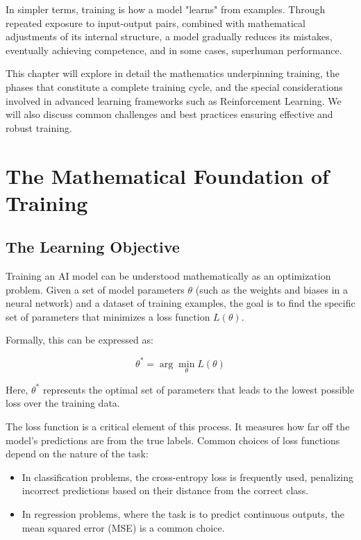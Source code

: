 \documentclass[openany]{book}
\begin{document}
In simpler terms, training is how a model "learns" from examples. Through 
repeated exposure to input-output pairs, combined with mathematical adjustments 
of its internal structure, a model gradually reduces its mistakes, eventually 
achieving competence, and in some cases, superhuman performance.

This chapter will explore in detail the mathematics underpinning training, the 
phases that constitute a complete training cycle, and the special considerations 
involved in advanced learning frameworks such as Reinforcement Learning. We will
also discuss common challenges and best practices ensuring effective and robust 
training.

\section{The Mathematical Foundation of Training}

\subsection{The Learning Objective}

Training an AI model can be understood mathematically as an optimization 
problem. Given a set of model parameters $\theta$ (such as the weights and 
biases in a neural network) and a dataset of training examples, the goal is to 
find the specific set of parameters that minimizes a loss function $L(\theta)$.

Formally, this can be expressed as:

\begin{equation}
\theta^* = \arg\min_{\theta} L(\theta)
\end{equation}

Here, $\theta^*$ represents the optimal set of parameters that leads to the 
lowest possible loss over the training data.

The loss function is a critical element of this process. It measures how far 
off the model's predictions are from the true labels. Common choices of loss 
functions depend on the nature of the task:

\begin{itemize}
    \item In classification problems, the cross-entropy loss is frequently used,
     penalizing incorrect predictions based on their distance from the correct 
     class.
    \item In regression problems, where the task is to predict continuous 
    outputs, the mean squared error (MSE) is a common choice.
\end{itemize}
\end{document}
